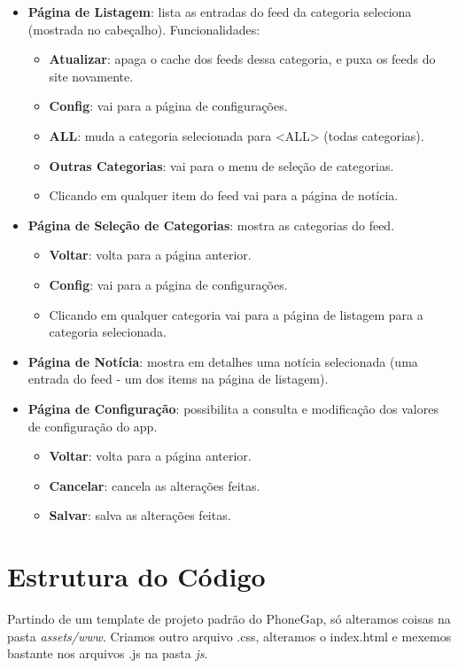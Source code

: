 \begin{itemize}
    \item \textbf{Página de Listagem}: lista as entradas do feed da categoria seleciona (mostrada no cabeçalho). Funcionalidades:
        \begin{itemize}
            \item \textbf{Atualizar}: apaga o cache dos feeds dessa categoria, e puxa os feeds do site novamente.
            \item \textbf{Config}: vai para a página de configurações.
            \item \textbf{ALL}: muda a categoria selecionada para <ALL> (todas categorias).
            \item \textbf{Outras Categorias}: vai para o menu de seleção de categorias.
            \item Clicando em qualquer item do feed vai para a página de notícia.
        \end{itemize}
    \item \textbf{Página de Seleção de Categorias}: mostra as categorias do feed.
        \begin{itemize}
            \item \textbf{Voltar}: volta para a página anterior.
            \item \textbf{Config}: vai para a página de configurações.
            \item Clicando em qualquer categoria vai para a página de listagem para a categoria selecionada.
        \end{itemize}
    \item \textbf{Página de Notícia}: mostra em detalhes uma notícia selecionada (uma entrada do feed - um dos items na página de listagem).
    \item \textbf{Página de Configuração}: possibilita a consulta e modificação dos valores de configuração do app.
        \begin{itemize}
            \item \textbf{Voltar}: volta para a página anterior.
            \item \textbf{Cancelar}: cancela as alterações feitas.
            \item \textbf{Salvar}: salva as alterações feitas.
        \end{itemize}
\end{itemize}

\section{Estrutura do Código}
Partindo de um template de projeto padrão do PhoneGap, só alteramos coisas na pasta 
\textit{assets/www}. Criamos outro arquivo .css, alteramos o index.html e mexemos bastante
nos arquivos .js na pasta \textit{js}.

